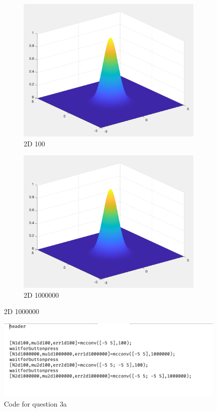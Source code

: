 \documentclass{article}
\begin{document}
\begin{figure}[H]
    \begin{subfigure}[h]{0.45\linewidth}
        \includegraphics[width=\linewidth]{imgs/q3a_2d_100.png}
        \caption{2D 100}
    \end{subfigure}
    \hfill
    \begin{subfigure}[h]{0.45\linewidth}
        \includegraphics[width=\linewidth]{imgs/q3a_2d_1000000.png}
        \caption{2D 1000000}
    \end{subfigure}
\end{figure}

\begin{figure}
    \centering
    \includegraphics[width=\linewidth]{imgs/q3a_code.png}
    \caption{Code for question 3a}
\end{figure}
\end{document}
